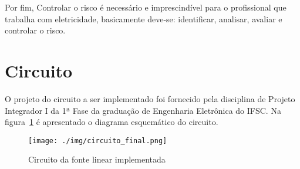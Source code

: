 \documentclass[
	article,			%
	11pt,				%
	oneside,			%
	a4paper,			%
	english,			%
	brazil,				%
	sumario=tradicional
	]{abntex2}
\begin{document}

Por fim, Controlar o risco é necessário e imprescindível para o profissional que trabalha com eletricidade, basicamente deve-se: identificar, analisar, avaliar e controlar o risco.

\section{Circuito}

O projeto do circuito a ser implementado foi fornecido pela disciplina de Projeto Integrador I da 1ª Fase da graduação de Engenharia Eletrônica do IFSC. Na figura~\ref{fig:FIG_circuito} é apresentado o diagrama esquemático do circuito. 

\begin{figure}[htb!]
\centering
\caption{Circuito da fonte linear implementada}
\texttt{[image: ./img/circuito\_final.png]}
\label{fig:FIG_circuito}
\end{figure} 
\end{document}
